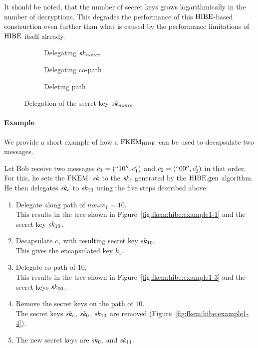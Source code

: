 It should be noted, that the number of secret keys grows logarithmically in the number of decryptions.
This degrades the performance of this $\mathrm{HIBE}$-based construction even further than what is caused by the performance limitations of $\mathrm{HIBE}$ itself already. 

\begin{figure}[!ht]
    \centering
    \begin{subfigure}{.33\textwidth}
        \centering
        
        \caption{Delegating $\mathit{sk}_\mathit{nonce}$}
        \label{fig:fkem:hibe:delegation1}
    \end{subfigure}\hfill
    \begin{subfigure}{.33\textwidth}
        \centering
        
        \caption{Delegating co-path}
        \label{fig:fkem:hibe:delegation3}
    \end{subfigure}\hfill
    \begin{subfigure}{.33\textwidth}
        \centering
        
        \caption{Deleting path}
        \label{fig:fkem:hibe:delegation4}
    \end{subfigure}
    \caption{Delegation of the secret key $\mathit{sk}_{\mathit{nonce}}$}
    \label{fig:fkem:hibe:delegation}
\end{figure}

\paragraph{Example} We provide a short example of how a $\mathrm{FKEM}_{\mathrm{HIBE}}$ can be used to decapsulate two messages.

Let Bob receive two messages $c_1=(``10'',c_1')$ and $c_2=(``00'',c_2')$ in that order.
For this, he sets the $\mathrm{FKEM}$~$\mathit{sk}$ to the $\mathit{sk}_\epsilon$ generated by the $\mathrm{HIBE}.\mathrm{gen}$ algorithm.
He then delegates $\mathit{sk}_\epsilon$ to $\mathit{sk}_{10}$ using the five steps described above:
\begin{enumerate}
    \item Delegate along path of $\mathit{nonce}_1=10$.\\
        This results in the tree shown in Figure~\ref{fig:fkem:hibe:example1-1} and the secret key $\mathit{sk}_{10}$.
    \item Decapsulate $c_1$ with resulting secret key $\mathit{sk}_{10}$.\\
        This gives the encapsulated key $k_1$.
    \item Delegate co-path of $10$.\\
        This results in the tree shown in Figure~\ref{fig:fkem:hibe:example1-3} and the secret keys $\mathit{sk}_{00}$.
    \item Remove the secret keys on the path of $10$.\\
        The secret keys $\mathit{sk}_\epsilon$, $\mathit{sk}_0$, $\mathit{sk}_{10}$ are removed (Figure~\ref{fig:fkem:hibe:example1-4}).
    \item The new secret keys are $\mathit{sk}_0$, and $\mathit{sk}_{11}$.
\end{enumerate}

